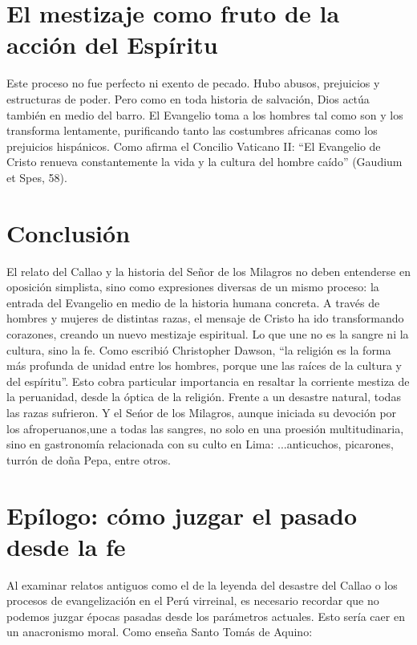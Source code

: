 \documentclass[a4paper,12pt]{article}
\begin{document}
	\section{El mestizaje como fruto de la acción del Espíritu}
	Este proceso no fue perfecto ni exento de pecado. Hubo abusos, prejuicios y estructuras de poder. Pero como en toda historia de salvación, Dios actúa también en medio del barro. El Evangelio toma a los hombres tal como son y los transforma lentamente, purificando tanto las costumbres africanas como los prejuicios hispánicos. Como afirma el Concilio Vaticano II: “El Evangelio de Cristo renueva constantemente la vida y la cultura del hombre caído” (Gaudium et Spes, 58).
	
	\section*{Conclusión}
	El relato del Callao y la historia del Señor de los Milagros no deben entenderse en oposición simplista, sino como expresiones diversas de un mismo proceso: la entrada del Evangelio en medio de la historia humana concreta. A través de hombres y mujeres de distintas razas, el mensaje de Cristo ha ido transformando corazones, creando un nuevo mestizaje espiritual. Lo que une no es la sangre ni la cultura, sino la fe. Como escribió Christopher Dawson, “la religión es la forma más profunda de unidad entre los hombres, porque une las raíces de la cultura y del espíritu”.
	Esto cobra particular importancia en resaltar la corriente mestiza de la peruanidad, desde la \'optica de la religi\'on. Frente a un desastre natural, todas las razas sufrieron. Y el Se\'nor de los Milagros, aunque iniciada su devoci\'on por los afroperuanos,une a todas las sangres, no solo en una proesi\'on multitudinaria, sino en gastronom\'ia relacionada con su culto en Lima: ...anticuchos, picarones, turrón de doña Pepa, entre otros.
	
	
	\section*{Epílogo: cómo juzgar el pasado desde la fe}
	
	Al examinar relatos antiguos como el de la leyenda del desastre del Callao o los procesos de evangelización en el Perú virreinal, es necesario recordar que no podemos juzgar épocas pasadas desde los parámetros actuales. Esto sería caer en un anacronismo moral. Como enseña Santo Tomás de Aquino:
	
\end{document}
